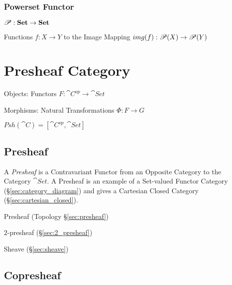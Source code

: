 \subsubsection{Powerset Functor}\label{sec:powerset_functor}

$\mathscr{P} : \mathbf{Set} \rightarrow \mathbf{Set}$

Functions $f : X \rightarrow Y$ to the Image Mapping $img(f) :
\mathscr{P}(X) \rightarrow \mathscr{P}(Y)$



\section{Presheaf Category}\label{sec:presheaf_category}

Objects: Functors $F: \cat{C}^{op} \rightarrow \cat{Set}$

Morphisms: Natural Transformations $\Phi : F \rightarrow G$

$Psh(\cat{C}) = [\cat{C}^{op},\cat{Set}]$



\subsection{Presheaf}\label{sec:category_presheaf}

A \emph{Presheaf} is a Contravariant Functor from an Opposite Category
to the Category $\cat{Set}$. A Presheaf is an example of a
Set-valued Functor Category (\S\ref{sec:category_diagram}) and gives a
Cartesian Closed Category (\S\ref{sec:cartesian_closed}).

Presheaf (Topology \S\ref{sec:presheaf})

$2$-presheaf (\S\ref{sec:2_presheaf})

Sheave (\S\ref{sec:sheave})



\subsection{Copresheaf}\label{sec:copresheaf}



